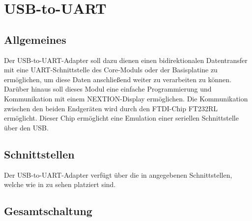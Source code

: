 \section{USB-to-UART}
\label{sec:usbtouart}


\subsection{Allgemeines}
\label{sec:usbtouart-allgemeines}
Der \gls{USB-to-UART}-Adapter soll dazu dienen einen bidirektionalen Datentransfer mit eine UART-Schnittstelle des \gls{Core-Modul}s oder der \gls{Basisplatine} zu ermöglichen, um diese Daten anschließend weiter zu verarbeiten zu können. Darüber hinaus soll dieses Modul eine einfache Programmierung und Kommunikation mit einem NEXTION-Display ermöglichen. Die Kommunikation zwischen den beiden Endgeräten wird durch den FTDI-Chip FT232RL ermöglicht. Dieser Chip ermöglicht eine Emulation einer seriellen Schnittstelle über den USB.

\subsection{Schnittstellen}
\label{sec:usbtouart-schnittstellen}

Der \gls{USB-to-UART}-Adapter verfügt über die in  angegebenen Schnittstellen, welche wie in  zu sehen platziert sind.



\subsection{Gesamtschaltung}
\label{sec:usbtouart-schaltung}

